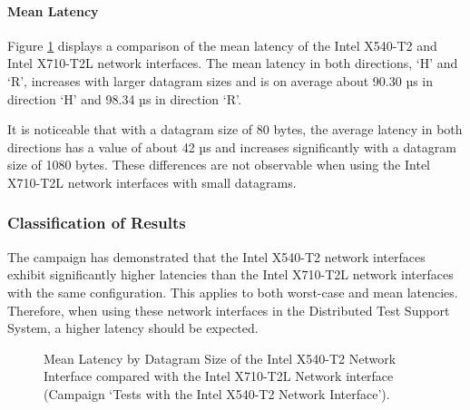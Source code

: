 \paragraph{Mean Latency}

Figure \ref{fig:540Mean} displays a comparison of the mean latency of the Intel X540-T2 and Intel X710-T2L network interfaces. The mean latency in both directions, `H' and `R', increases with larger datagram sizes and is on average about 90.30 µs in direction `H' and 98.34 µs in direction `R'.

It is noticeable that with a datagram size of 80 bytes, the average latency in both directions has a value of about 42 µs and increases significantly with a datagram size of 1080 bytes. These differences are not observable when using the Intel X710-T2L network interfaces with small datagrams.

\subsubsection{Classification of Results}
The campaign has demonstrated that the Intel X540-T2 network interfaces exhibit significantly higher latencies than the Intel X710-T2L network interfaces with the same configuration. This applies to both worst-case and mean latencies. Therefore, when using these network interfaces in the Distributed Test Support System, a higher latency should be expected. \\

\begin{figure}[h!]
  \centering
  \caption{Mean Latency by Datagram Size of the Intel X540-T2 Network Interface compared with the Intel X710-T2L Network interface (Campaign `Tests with the Intel X540-T2 Network Interface').}
  \label{fig:540Mean}
\end{figure}

